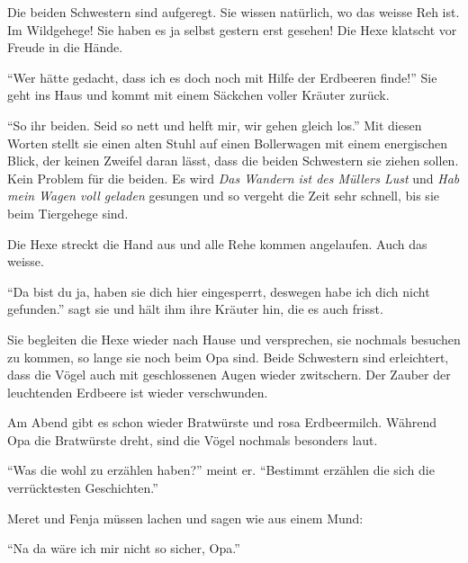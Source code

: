 Die beiden Schwestern sind aufgeregt. Sie wissen natürlich, wo das weisse Reh ist. Im Wildgehege! Sie haben es ja selbst gestern erst gesehen! Die Hexe klatscht vor Freude in die Hände. 

\enquote{Wer hätte gedacht, dass ich es doch noch mit Hilfe der Erdbeeren finde!} Sie geht ins Haus und kommt mit einem Säckchen voller Kräuter zurück. 

\enquote{So ihr beiden. Seid so nett und helft mir, wir gehen gleich los.} Mit diesen Worten stellt sie einen alten Stuhl auf einen Bollerwagen mit einem energischen Blick, der keinen Zweifel daran lässt, dass die beiden Schwestern sie ziehen sollen. Kein Problem für die beiden. Es wird \textit{Das Wandern ist des Müllers Lust} und \textit{Hab mein Wagen voll geladen} gesungen und so vergeht die Zeit sehr schnell, bis sie beim Tiergehege sind.

Die Hexe streckt die Hand aus und alle Rehe kommen angelaufen. Auch das weisse.

\enquote{Da bist du ja, haben sie dich hier eingesperrt, deswegen habe ich dich nicht gefunden.} sagt sie und hält ihm ihre Kräuter hin, die es auch frisst.

Sie begleiten die Hexe wieder nach Hause und versprechen, sie nochmals besuchen zu kommen, so lange sie noch beim Opa sind. Beide Schwestern sind erleichtert, dass die Vögel auch mit geschlossenen Augen wieder zwitschern. Der Zauber der leuchtenden Erdbeere ist wieder verschwunden.

Am Abend gibt es schon wieder Bratwürste und rosa Erdbeermilch. Während Opa die Bratwürste dreht, sind die Vögel nochmals besonders laut.

\enquote{Was die wohl zu erzählen haben?} meint er. \enquote{Bestimmt erzählen die sich die verrücktesten Geschichten.}

Meret und Fenja müssen lachen und sagen wie aus einem Mund:

\enquote{Na da wäre ich mir nicht so sicher, Opa.} \hfill {\color{red}\decofourleft}

